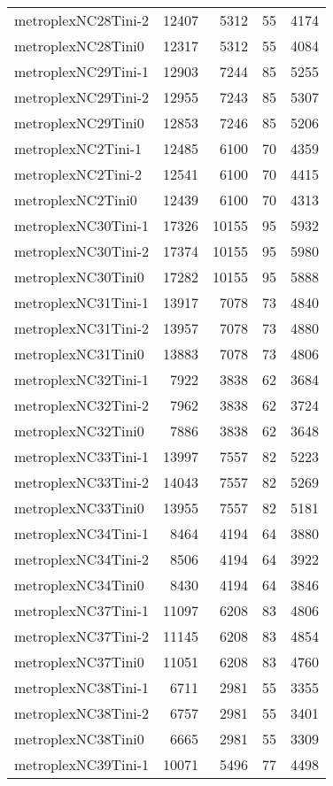 \documentclass[../../../thesis.tex]{subfiles}
\begin{document}
\begin{longtable}{lrrrr}
metroplexNC28Tini-2 & 12407 & 5312 & 55 & 4174 \\
metroplexNC28Tini0 & 12317 & 5312 & 55 & 4084 \\
metroplexNC29Tini-1 & 12903 & 7244 & 85 & 5255 \\
metroplexNC29Tini-2 & 12955 & 7243 & 85 & 5307 \\
metroplexNC29Tini0 & 12853 & 7246 & 85 & 5206 \\
metroplexNC2Tini-1 & 12485 & 6100 & 70 & 4359 \\
metroplexNC2Tini-2 & 12541 & 6100 & 70 & 4415 \\
metroplexNC2Tini0 & 12439 & 6100 & 70 & 4313 \\
metroplexNC30Tini-1 & 17326 & 10155 & 95 & 5932 \\
metroplexNC30Tini-2 & 17374 & 10155 & 95 & 5980 \\
metroplexNC30Tini0 & 17282 & 10155 & 95 & 5888 \\
metroplexNC31Tini-1 & 13917 & 7078 & 73 & 4840 \\
metroplexNC31Tini-2 & 13957 & 7078 & 73 & 4880 \\
metroplexNC31Tini0 & 13883 & 7078 & 73 & 4806 \\
metroplexNC32Tini-1 & 7922 & 3838 & 62 & 3684 \\
metroplexNC32Tini-2 & 7962 & 3838 & 62 & 3724 \\
metroplexNC32Tini0 & 7886 & 3838 & 62 & 3648 \\
metroplexNC33Tini-1 & 13997 & 7557 & 82 & 5223 \\
metroplexNC33Tini-2 & 14043 & 7557 & 82 & 5269 \\
metroplexNC33Tini0 & 13955 & 7557 & 82 & 5181 \\
metroplexNC34Tini-1 & 8464 & 4194 & 64 & 3880 \\
metroplexNC34Tini-2 & 8506 & 4194 & 64 & 3922 \\
metroplexNC34Tini0 & 8430 & 4194 & 64 & 3846 \\
metroplexNC37Tini-1 & 11097 & 6208 & 83 & 4806 \\
metroplexNC37Tini-2 & 11145 & 6208 & 83 & 4854 \\
metroplexNC37Tini0 & 11051 & 6208 & 83 & 4760 \\
metroplexNC38Tini-1 & 6711 & 2981 & 55 & 3355 \\
metroplexNC38Tini-2 & 6757 & 2981 & 55 & 3401 \\
metroplexNC38Tini0 & 6665 & 2981 & 55 & 3309 \\
metroplexNC39Tini-1 & 10071 & 5496 & 77 & 4498 \\

\end{longtable}
\end{document}
